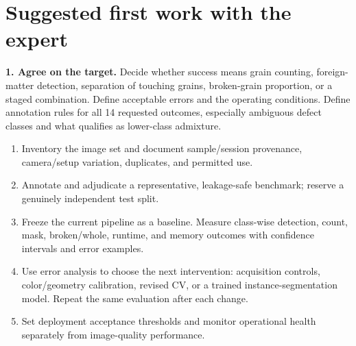 \documentclass[10pt,a4paper]{article}
\begin{document}
\section{Suggested first work with the expert}
\textbf{1. Agree on the target.} Decide whether success means grain counting, foreign-matter detection, separation of touching grains, broken-grain proportion, or a staged combination. Define acceptable errors and the operating conditions. Define annotation rules for all 14 requested outcomes, especially ambiguous defect classes and what qualifies as lower-class admixture.

\begin{enumerate}[start=2,label=\bfseries\arabic*.,leftmargin=19pt]
  \item Inventory the image set and document sample/session provenance, camera/setup variation, duplicates, and permitted use.
  \item Annotate and adjudicate a representative, leakage-safe benchmark; reserve a genuinely independent test split.
  \item Freeze the current pipeline as a baseline. Measure class-wise detection, count, mask, broken/whole, runtime, and memory outcomes with confidence intervals and error examples.
  \item Use error analysis to choose the next intervention: acquisition controls, color/geometry calibration, revised CV, or a trained instance-segmentation model. Repeat the same evaluation after each change.
  \item Set deployment acceptance thresholds and monitor operational health separately from image-quality performance.
\end{enumerate}
\end{document}
